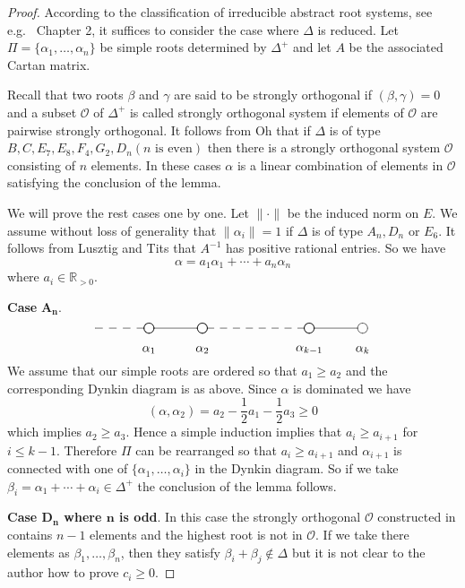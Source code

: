 \documentclass[12pt]{amsart}
\theoremstyle{definition}
\theoremstyle{remark}
\numberwithin{equation}{section}
\begin{document}
\begin{proof}
According to the classification of irreducible abstract  root systems, see e.g.~\cite{knapp} Chapter 2,
it suffices to consider the case where  $\Delta $ is reduced. 
 Let $\Pi=\{\alpha_1, \ldots, \alpha_n\}$ be simple roots 
determined by  $\Delta^+$  and let $A$ be the associated  Cartan matrix.

 Recall that two roots $\beta$ and $\gamma$ are said to be  strongly
orthogonal if $( \beta, \gamma)=0$ and 
a subset $\mathcal O$ of $\Delta^+$ is called strongly orthogonal system if elements of $\mathcal O$
are pairwise strongly orthogonal. 
It follows from Oh \cite{oh98} that
if $\Delta$ is of  type 
 $B, C,E_7, E_8, F_4, G_2, D_n (n \mbox{ is even})$ then
 there is a strongly orthogonal system $\mathcal O$  consisting of $n$ elements.
 In these cases
$\alpha$ is a linear combination
 of elements in $\mathcal O$ satisfying the conclusion  of the lemma. 

We will prove the rest cases one by one. 
Let $\|\cdot\|$ be the induced norm on $E$.   We assume without loss of generality that 
 $\|\alpha_i\|=1$ if $\Delta$ is of type $A_n, D_n$ or $ E_6$.
It follows from  Lusztig and Tits \cite{lt92} that $A^{-1}$ has positive rational entries. So  we have
\[
\alpha=a_1\alpha_1+\cdots+a_n\alpha_n
\]
where $a_i\in \mathbb R_{>0}$.

{\bf Case}   $\mathbf {A_n}$.
\[ 
\xy 
(-15,0)*{\cir<0pt>{}}; (0,0)*{\cir<4pt>{}}; **\dir{--};
(0,0)*{\cir<4pt>{}}; (15,0)*{\cir<4pt>{}}; **\dir{-};
(15,0)*{\cir<4pt>{}}; (45,0)*{\cir<4pt>{}}; **\dir{--};
(45,0)*{\cir<4pt>{}}; (60,0)*{\cir<4pt>{}}; **\dir{-};
(0,-6)*{\alpha_1};
(15, -6)*{\alpha_{2}};
(45, -6)*{\alpha_{k-1}};
(60, -6)*{\alpha_{k}};
\endxy 
\]
We assume that our simple roots are ordered so that  $a_1\ge a_2$
and the corresponding Dynkin  diagram is as above. 
  Since $\alpha$
is dominated we have
\[
(\alpha, \alpha_2)=a_2-\frac{1}{2}a_1-\frac{1}{2}a_3\ge 0
\]
which implies  $a_2\ge a_3$. Hence a simple induction implies that  $a_i\ge a_{i+1}$ for $i\le k-1$. 
Therefore
 $\Pi$ can be rearranged so that  $a_i\ge a_{i+1}$  and $\alpha_{i+1}$ is connected with one
 of $\{\alpha_1, \ldots, \alpha_i\}$ in the Dynkin diagram.  
So  if we take  $\beta_i=\alpha_1+\cdots+\alpha_i\in \Delta ^+$ the conclusion of the lemma follows.

 {\bf Case $\mathbf {D_n}$ where $\mathbf n$ is odd}. 
In this case the strongly orthogonal $\mathcal O$ constructed in \cite{oh98} contains 
$n-1$ elements and the highest root is not in $\mathcal O$. 
If we take there elements as $\beta_1,\ldots, \beta_n$, then
they satisfy $\beta_i+\beta_j\not \in \Delta$ but it is not clear to 
the author how to prove $c_i\ge 0$.


\end{proof}
\end{document}
